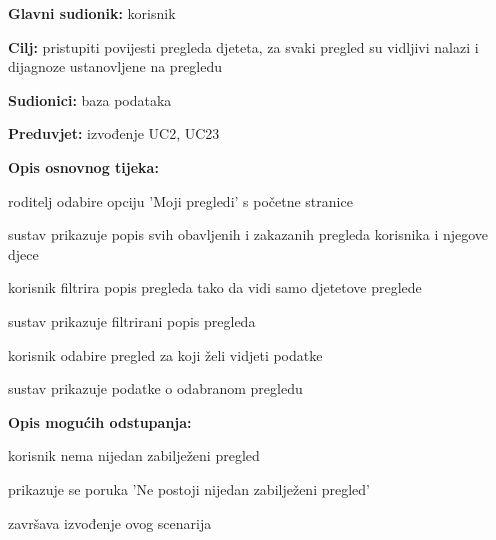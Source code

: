 					\noindent {}
					\begin{packed_item}
	
						\item \textbf{Glavni sudionik: }korisnik
						\item  \textbf{Cilj:} pristupiti povijesti pregleda djeteta, za svaki pregled su vidljivi nalazi i dijagnoze ustanovljene na pregledu
						\item  \textbf{Sudionici:} baza podataka
						\item  \textbf{Preduvjet:} izvođenje UC2, UC23
						\item  \textbf{Opis osnovnog tijeka:}
						
						\item[] \begin{packed_enum}
	
							\item roditelj odabire opciju 'Moji pregledi' s početne stranice
							\item sustav prikazuje popis svih obavljenih i zakazanih pregleda korisnika i njegove djece
							\item korisnik filtrira popis pregleda tako da vidi samo djetetove preglede
							\item sustav prikazuje filtrirani popis pregleda
							\item korisnik odabire pregled za koji želi vidjeti podatke
							\item sustav prikazuje podatke o odabranom pregledu
							
						\end{packed_enum}
						\item  \textbf{Opis mogućih odstupanja:}
						
						\item[] \begin{packed_item}
							\item[2.a] korisnik nema nijedan zabilježeni pregled
							\item[] 
							\begin{packed_enum} 
								\item prikazuje se poruka 'Ne postoji nijedan zabilježeni pregled'
								\item završava izvođenje ovog scenarija
								
							\end{packed_enum}
						\end{packed_item}
					\end{packed_item}

